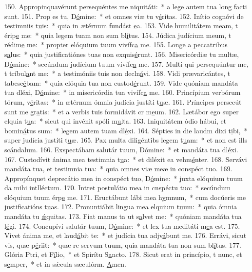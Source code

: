 150. Appropinquavérunt persequéntes me niquit\uline{á}ti:~* a lege autem tua long f\uline{a}cti sunt.
151. Prop es tu, D\uline{ó}mine:~* et omnes viæ tu v\uline{é}ritas.
152. Inítio cognóvi de testimniis t\uline{u}is:~* quia in ætérnum fundást \uline{e}a.
153. Vide humilitátem meam, t érip\uline{e} me:~* quia legem tuam non sum bl\uline{í}tus.
154. Júdica judícium meum, t rédim\uline{e} me:~* propter elóquium tuum vivífc\uline{a} me.
155. Longe a peccatribus s\uline{a}lus:~* quia justificatiónes tuas non exquis\uline{é}runt.
156. Misericórdiæ tu multæ, D\uline{ó}mine:~* secúndum judícium tuum vivífc\uline{a} me.
157. Multi qui persequúntur me, t tríbul\uline{a}nt me:~* a testimóniis tuis non decln\uline{á}vi.
158. Vidi prævaricántes, t tabesc\uline{é}bam:~* quia elóquia tua non custod\uline{é}runt.
159. Vide quóniam mandáta tua dléxi, D\uline{ó}mine:~* in misericórdia tua vivífc\uline{a} me.
160. Princípium verbórum tórum, v\uline{é}ritas:~* in ætérnum ómnia judícia justíti t\uline{u}æ.
161. Príncipes persecút sunt me gr\uline{a}tis:~* et a verbis tuis formidávit cr m\uline{e}um.
162. Lætábor ego super elquia t\uline{u}a:~* sicut qui invénit spóli m\uline{u}lta.
163. Iniquitátem ódio hábui, et bomin\uline{á}tus sum:~* legem autem tuam dl\uline{é}xi.
164. Sépties in die laudm dixi t\uline{i}bi,~* super judícia justíti t\uline{u}æ.
165. Pax multa diligéntibs legem t\uline{u}am:~* et non est ills sc\uline{á}ndalum.
166. Exspectábam salutár tuum, D\uline{ó}mine:~* et mandáta tua dl\uline{é}xi.
167. Custodívit ánima mea testimnia t\uline{u}a:~* et diléxit ea vehm\uline{é}nter.
168. Servávi mandáta tua, et testimnia t\uline{u}a:~* quia omnes viæ meæ in conspéct t\uline{u}o.
169. Appropínquet deprecátio mea in conspéct tuo, D\uline{ó}mine:~* juxta elóquium tuum da mihi intll\uline{é}ctum.
170. Intret postulátio mea in cnspéctu t\uline{u}o:~* secúndum elóquium tuum érp\uline{e} me.
171. Eructábunt lábi mea h\uline{y}mnum,~* cum docúeris me justificatións t\uline{u}as.
172. Pronuntiábit lingua mea elquium t\uline{u}um:~* quia ómnia mandáta tu \uline{ǽ}quitas.
173. Fiat manus ta ut s\uline{a}lvet me:~* quóniam mandáta tua l\uline{é}gi.
174. Concupívi salutár tuum, D\uline{ó}mine:~* et lex tua meditáti m\uline{e}a est.
175. Vivet ánima me, et laud\uline{á}bit te:~* et judícia tua adjv\uline{á}bunt me.
176. Errávi, sicut vis, quæ p\uline{é}riit:~* quæ re servum tuum, quia mandáta tua non sum bl\uline{í}tus.
177. Glória Ptri, et F\uline{í}lio,~* et Spirítu S\uline{a}ncto.
178. Sicut erat in princípio, t nunc, et s\uline{e}mper,~* et in sǽcula sæculórm. \uline{A}men.

